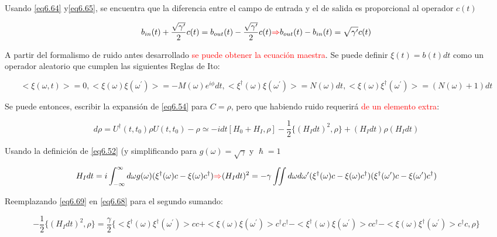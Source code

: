 \documentclass{book}
\begin{document}
Usando \ref{eq6.64} y\ref{eq6.65}, se encuentra que la diferencia entre el campo de entrada y el de salida es proporcional al operador $c(t)$

\begin{equation}\label{eq6.66}b_{in}(t)+\frac{\sqrt{\gamma^\prime}}{2}c(t)=b_{out}(t)-\frac{\sqrt{\gamma^\prime}}{2}c(t)\textcolor{red}{\Rightarrow}b_{out}(t)-b_{in}(t)=\sqrt{\gamma^\prime}c(t)\end{equation}

A partir del formalismo de ruido antes desarrollado \textcolor{red}{se puede obtener la ecuación maestra}. Se puede definir $\xi(t)=b(t) dt$ como un operador aleatorio que cumplen las siguientes Reglas de Ito:

\begin{equation}\label{eq6.67}<\xi(\omega,t)>=0, <\xi(\omega)\xi(\omega^\prime)>=-M(\omega)e^{i\phi}dt, <\xi^\dag(\omega)\xi(\omega^\prime)>=N(\omega)dt,<\xi(\omega)\xi^\dag (\omega^\prime)>=(N(\omega)+1)dt \end{equation}

Se puede entonces, escribir la expansión de \ref{eq6.54} para $C=\rho$, pero que habiendo ruido requerirá \textcolor{red}{de un elemento extra}:

\begin{equation}\label{eq6.68} d\rho=U^\dag(t,t_0)\rho U(t,t_0)-\rho\simeq -idt [H_0+H_I,\rho]-\frac{1}{2}\{(H_I dt)^2,\rho\}+(H_Idt)\rho(H_Idt)\end{equation}

Usando la definición de \ref{eq6.52} (y simplificando para $g(\omega)=\sqrt{\gamma}$ y $\hslash=1$

\begin{equation}\label{eq6.69}H_Idt=i \int_{-\infty}^\infty d\omega g(\omega)(\xi^\dag(\omega)c-\xi(\omega) c^\dag)  \textcolor{red}{\Rightarrow} (H_Idt)^2=-\gamma\iint d\omega d\omega^\prime (\xi^\dag(\omega)c-\xi(\omega)c^\dag)(\xi^\dag(\omega^\prime)c-\xi(\omega^\prime)c^\dag)\end{equation}

Reemplazando \ref{eq6.69} en \ref{eq6.68} para el segundo sumando:

\begin{equation}\label{eq6.70}-\frac{1}{2}\{(H_Idt)^2,\rho\}=\frac{\gamma}{2}\{<\xi^\dag(\omega)\xi^\dag(\omega^\prime)>cc+<\xi(\omega)\xi(\omega^\prime)>c^\dag c^\dag-<\xi^\dag(\omega)\xi(\omega^\prime)>cc^\dag-<\xi(\omega)\xi^\dag(\omega^\prime)>c^\dag c,\rho\}\end{equation}
\end{document}

